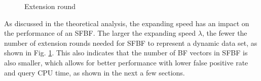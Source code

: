 \documentclass[10pt,journal,compsoc]{IEEEtran}
\begin{document}
\begin{figure}[!h]
\center
{}
\caption{Extension round}
\label{fig:Extension round.}
\end{figure}

As discussed in the theoretical analysis, the expanding speed has an impact on the performance of an SFBF. The larger the expanding speed $\lambda$, the fewer the number of extension rounds needed for SFBF to represent a dynamic data set, as shown in Fig. \ref{fig:Extension round.}. This also indicates that the number of BF vectors in SFBF is also smaller, which allows for better performance with lower false positive rate and query CPU time, as shown in the next a few sections.
\end{document}
